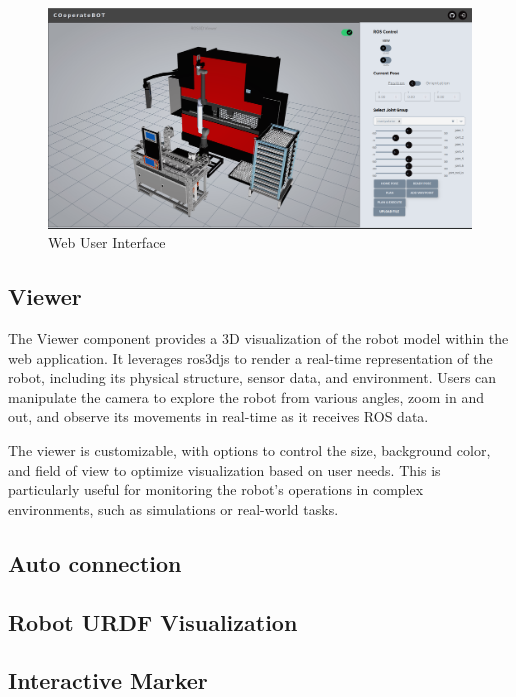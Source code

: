 
\begin{figure}[h]
    \centering
    \includegraphics[width=1\textwidth]{figures/webui/webui0.png}
    \caption{Web User Interface}
    \label{fig:web-ui}
\end{figure}

\subsection{Viewer}
\label{subsec:web-ui-viewer}
The Viewer component provides a 3D visualization of the robot model within the web application. It leverages ros3djs to render a real-time representation of the robot, including its physical structure, sensor data, and environment. Users can manipulate the camera to explore the robot from various angles, zoom in and out, and observe its movements in real-time as it receives ROS data.

The viewer is customizable, with options to control the size, background color, and field of view to optimize visualization based on user needs. This is particularly useful for monitoring the robot's operations in complex environments, such as simulations or real-world tasks.


\subsection{Auto connection}
\label{subsec:web-ui-auto-connection}


\subsection{Robot URDF Visualization}
\label{subsec:web-ui-urdf-visualization}

\subsection{Interactive Marker}
\label{subsec:web-ui-interactive-marker}


